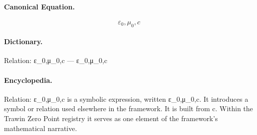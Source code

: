 \paragraph{Canonical Equation.}
\[
\varepsilon_0,\mu_0,c
\]

\paragraph{Dictionary.}
Relation: ε\_0,μ\_0,c — ε\_0,μ\_0,c

\paragraph{Encyclopedia.}
Relation: ε\_0,μ\_0,c is a symbolic expression, written ε\_0,μ\_0,c. It introduces a symbol or relation used elsewhere in the framework. It is built from c. Within the Trawin Zero Point registry it serves as one element of the framework's mathematical narrative.
